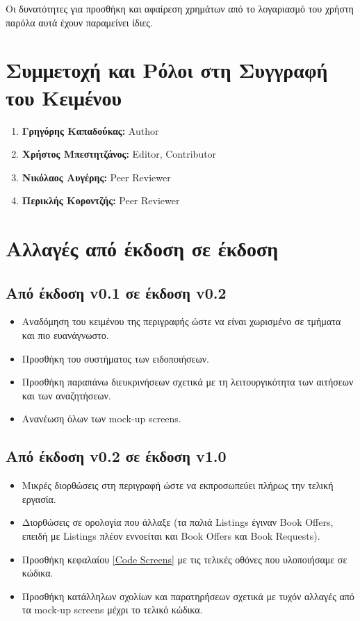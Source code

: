 \documentclass[12pt,a4paper]{article}
\begin{document}
Οι δυνατότητες για προσθήκη και αφαίρεση χρημάτων από το λογαριασμό του χρήστη παρόλα αυτά έχουν παραμείνει ίδιες.

\section{Συμμετοχή και Ρόλοι στη Συγγραφή του Κειμένου}

\begin{enumerate}
	\item \textbf{Γρηγόρης Καπαδούκας:} Author
	\item \textbf{Χρήστος Μπεστητζάνος:} Editor, Contributor
	\item \textbf{Νικόλαος Αυγέρης:} Peer Reviewer
	\item \textbf{Περικλής Κοροντζής:} Peer Reviewer
\end{enumerate}

\section{Αλλαγές από έκδοση σε έκδοση}

\subsection{Από έκδοση v0.1 σε έκδοση v0.2}
\begin{itemize}
    \item Αναδόμηση του κειμένου της περιγραφής ώστε να είναι χωρισμένο σε τμήματα και πιο ευανάγνωστο. 
    \item Προσθήκη του συστήματος των ειδοποιήσεων.
    \item Προσθήκη παραπάνω διευκρινήσεων σχετικά με τη λειτουργικότητα των αιτήσεων και των αναζητήσεων.
    \item Ανανέωση όλων των mock-up screens.
\end{itemize}

\subsection{Από έκδοση v0.2 σε έκδοση v1.0}
\begin{itemize}
    \item Μικρές διορθώσεις στη περιγραφή ώστε να εκπροσωπεύει πλήρως την τελική εργασία.
    \item Διορθώσεις σε ορολογία που άλλαξε (τα παλιά Listings έγιναν Book Offers, επειδή με Listings πλέον εννοείται και Book Offers και Book Requests).
    \item Προσθήκη κεφαλαίου \ref{Code Screens} με τις τελικές οθόνες που υλοποιήσαμε σε κώδικα.
    \item Προσθήκη κατάλληλων σχολίων και παρατηρήσεων σχετικά με τυχόν αλλαγές από τα mock-up screens μέχρι το τελικό κώδικα.
\end{itemize}
\end{document}
